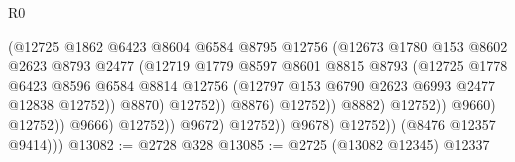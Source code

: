 \begin{lexlean}{R0}
\begin{coremodule}
                                            (@12725
                                              @1862
                                              @6423
                                              @8604
                                              @6584
                                              @8795
                                              @12756
                                              (@12673
                                                @1780
                                                @153
                                                @8602
                                                @2623
                                                @8793
                                                @2477
                                                (@12719
                                                  @1779
                                                  @8597
                                                  @8601
                                                  @8815
                                                  @8793
                                                  (@12725
                                                    @1778
                                                    @6423
                                                    @8596
                                                    @6584
                                                    @8814
                                                    @12756
                                                    (@12797
                                                      @153
                                                      @6790
                                                      @2623
                                                      @6993
                                                      @2477
                                                      @12838
                                                      @12752))
                                                  @8870)
                                                @12752))
                                            @8876)
                                          @12752))
                                      @8882)
                                    @12752))
                                @9660)
                              @12752))
                          @9666)
                        @12752))
                    @9672)
                  @12752))
              @9678)
            @12752))
        (@8476 @12357 @9414)))
@13082 := @2728 @328
@13085 := @2725 (@13082 @12345) @12337

\end{coremodule}
\end{lexlean}
